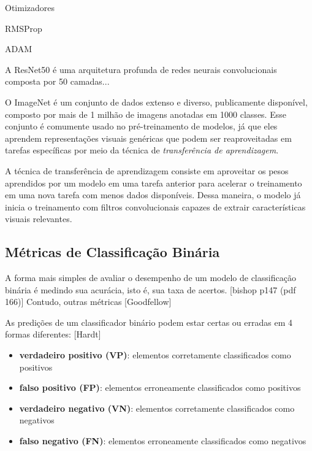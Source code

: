 \documentclass[12pt]{article}
\begin{document}
Otimizadores

RMSProp

ADAM






A ResNet50 é uma arquitetura profunda de redes neurais convolucionais composta por 50 camadas...

O ImageNet é um conjunto de dados extenso e diverso, publicamente disponível, composto por mais de 1 milhão de imagens anotadas em 1000 classes. Esse conjunto é comumente usado no pré-treinamento de modelos, já que eles aprendem representações visuais genéricas que podem ser reaproveitadas em tarefas específicas por meio da técnica de \emph{transferência de aprendizagem}.

A técnica de transferência de aprendizagem consiste em aproveitar os pesos aprendidos por um modelo em uma tarefa anterior para acelerar o treinamento em uma nova tarefa com menos dados disponíveis. Dessa maneira, o modelo já inicia o treinamento com filtros convolucionais capazes de extrair características visuais relevantes.



\subsection{Métricas de Classificação Binária}
\label{sec:metrics_classification}

A forma mais simples de avaliar o desempenho de um modelo de classificação binária é medindo sua acurácia, isto é, sua taxa de acertos. [bishop p147 (pdf 166)] Contudo, outras métricas [Goodfellow]

As predições de um classificador binário podem estar certas ou erradas em 4 formas diferentes: [Hardt]

\begin{itemize}[noitemsep]
    \item \textbf{verdadeiro positivo (VP)}: elementos corretamente classificados como positivos
    \item \textbf{falso positivo (FP)}: elementos erroneamente classificados como positivos
    \item \textbf{verdadeiro negativo (VN)}: elementos corretamente classificados como negativos
    \item \textbf{falso negativo (FN)}: elementos erroneamente classificados como negativos
\end{itemize}
\end{document}
